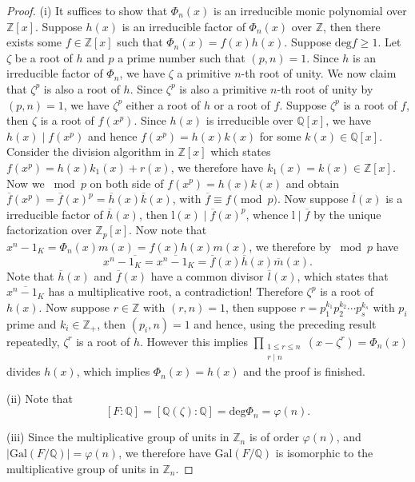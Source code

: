 \begin{proof}
(i) It suffices to show that $\Phi_n(x)$ is an irreducible monic polynomial over $\mathbb{Z}[x]$. Suppose $h(x)$ is an irreducible factor of $\Phi_n(x)$ over $\mathbb{Z}$, then there exists some $f\in\mathbb{Z}[x]$ such that $\Phi_n(x)=f(x)h(x)$. Suppose $\mathrm{deg}f\ge 1$. Let $\zeta$ be a root of $h$ and $p$ a prime number such that $(p,n)=1$. Since $h$ is an irreducible factor of $\Phi_n$, we have $\zeta$ a primitive $n$-th root of unity. We now claim that $\zeta^p$ is also a root of $h$. Since $\zeta^p$ is also a primitive $n$-th root of unity by $(p,n)=1$, we have $\zeta^p$ either a root of $h$ or a root of $f$. Suppose $\zeta^p$ is a root of $f$, then $\zeta$ is a root of $f(x^p)$. Since $h(x)$ is irreducible over $\mathbb{Q}[x]$, we have $h(x)\mid f(x^p)$ and hence $f(x^p)=h(x)k(x)$ for some $k(x)\in\mathbb{Q}[x]$. Consider the division algorithm in $\mathbb{Z}[x]$ which states $f(x^p)=h(x)k_1(x)+r(x)$, we therefore have $k_1(x)=k(x)\in\mathbb{Z}[x]$. Now we $\bmod{p}$ on both side of $f(x^p)=h(x)k(x)$ and obtain $\overline{f}(x^p)=\overline{f}(x)^p=\overline{h}(x)\overline{k}(x)$, with $\overline{f}\equiv f\pmod{p}$. Now suppose $\overline{l}(x)$ is a irreducible factor of $\overline{h}(x)$, then $\mathrm{l}(x)\mid \overline{f}(x)^p$, whence $\mathrm{l}\mid\overline{f}$ by the unique factorization over $\mathbb{Z}_p[x]$. Now note that $x^n-1_K=\Phi_n(x)m(x)=f(x)h(x)m(x)$, we therefore by $\bmod{p}$ have 
$$
x^n-\overline{1_K}=\overline{x^n-1_K}=\overline{f}\left( x \right) \overline{h}\left( x \right) \overline{m}\left( x \right) .
$$
Note that $\overline{h}(x)$ and $\overline{f}(x)$ have a common divisor $\overline{l}(x)$, which states that $\overline{x^n-1_K}$ has a multiplicative root, a contradiction! Therefore $\zeta^p$ is a root of $h(x)$. Now suppose $r\in\mathbb{Z}$ with $(r,n)=1$, then suppose $r=p_1^{k_1}p_2^{k_2}\cdots p_s^{k_s}$ with $p_i$ prime and $k_i\in\mathbb{Z}_+$, then $(p_i,n)=1$ and hence, using the preceding result repeatedly, $\zeta^r$ is a root of $h$. However this implies $\prod_{\substack{1\le r\le n \\ r\mid n}}(x-\zeta^r)=\Phi_n(x)$ divides $h(x)$, which implies $\Phi_n(x)=h(x)$ and the proof is finished.\par
(ii) Note that 
$$
\left[ F:\mathbb{Q} \right] =\left[ \mathbb{Q} \left( \zeta \right) :\mathbb{Q} \right] =\mathrm{deg}\Phi _n=\varphi \left( n \right) .
$$\par
(iii) Since the multiplicative group of units in $\mathbb{Z}_n$ is of order $\varphi(n)$, and $|\mathrm{Gal}(F/\mathbb{Q})|=\varphi(n)$, we therefore have $\mathrm{Gal}(F/\mathbb{Q})$ is isomorphic to the multiplicative group of units in $\mathbb{Z}_n$.
\end{proof}

